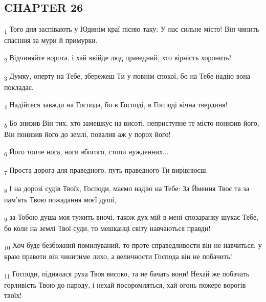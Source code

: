 \subsection{CHAPTER 26}
\begin{tcolorbox}
\textsubscript{1} Того дня заспівають у Юдинім краї пісню таку: У нас сильне місто! Він чинить спасіння за мури й примурки.
\end{tcolorbox}
\begin{tcolorbox}
\textsubscript{2} Відчиняйте ворота, і хай ввійде люд праведний, хто вірність хоронить!
\end{tcolorbox}
\begin{tcolorbox}
\textsubscript{3} Думку, оперту на Тебе, збережеш Ти у повнім спокої, бо на Тебе надію вона покладає.
\end{tcolorbox}
\begin{tcolorbox}
\textsubscript{4} Надійтеся завжди на Господа, бо в Господі, в Господі вічна твердиня!
\end{tcolorbox}
\begin{tcolorbox}
\textsubscript{5} Бо знизив Він тих, хто замешкує на висоті, неприступне те місто понизив його, Він понизив його до землі, повалив аж у порох його!
\end{tcolorbox}
\begin{tcolorbox}
\textsubscript{6} Його топче нога, ноги вбогого, стопи нужденних...
\end{tcolorbox}
\begin{tcolorbox}
\textsubscript{7} Проста дорога для праведного, путь праведного Ти вирівнюєш.
\end{tcolorbox}
\begin{tcolorbox}
\textsubscript{8} І на дорозі судів Твоїх, Господи, маємо надію на Тебе: За Ймення Твоє та за пам'ять Твою пожадання моєї душі,
\end{tcolorbox}
\begin{tcolorbox}
\textsubscript{9} за Тобою душа моя тужить вночі, також дух мій в мені спозаранку шукає Тебе, бо коли на землі Твої суди, то мешканці світу навчаються правди!
\end{tcolorbox}
\begin{tcolorbox}
\textsubscript{10} Хоч буде безбожний помилуваний, то проте справедливости він не навчиться: у краю правоти він чинитиме лихо, а величности Господа він не побачить!
\end{tcolorbox}
\begin{tcolorbox}
\textsubscript{11} Господи, піднялася рука Твоя високо, та не бачать вони! Нехай же побачать горливість Твою до народу, і нехай посоромляться, хай огонь пожере ворогів твоїх!
\end{tcolorbox}
